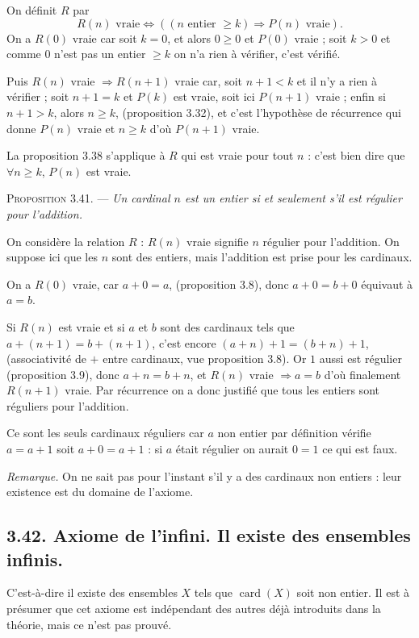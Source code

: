 On définit $R$ par
\[
R(n)\text{ vraie}\Leftrightarrow((n\text{ entier }\ge k)\Rightarrow P(n)\text{ vraie}).
\]
On a $R(0)$ vraie car soit $k=0$, et alors $0\ge0$ et $P(0)$ vraie ; soit $k>0$ et comme $0$ n'est pas un entier $\ge k$ on n'a rien à vérifier, c'est vérifié.

Puis $R(n)$ vraie $\Rightarrow R(n+1)$ vraie car, soit $n+1<k$ et il n'y a rien à vérifier ; soit $n+1=k$ et $P(k)$ est vraie, soit ici $P(n+1)$ vraie ; enfin si $n+1>k$, alors $n\ge k$, (proposition 3.32), et c'est l'hypothèse de récurrence qui donne $P(n)$ vraie et $n\ge k$ d'où $P(n+1)$ vraie.

La proposition 3.38 s'applique à $R$ qui est vraie pour tout $n$ : c'est bien dire que $\forall n\ge k$, $P(n)$ est vraie. \bookend

\medskip\noindent\textsc{Proposition 3.41.} --- \emph{Un cardinal $n$ est un entier si et seulement s'il est régulier pour l'addition.}

On considère la relation $R$ : $R(n)$ vraie signifie $n$ régulier pour l'addition. On suppose ici que les $n$ sont des entiers, mais l'addition est prise pour les cardinaux.

On a $R(0)$ vraie, car $a+0=a$, (proposition 3.8), donc $a+0=b+0$ équivaut à $a=b$.

Si $R(n)$ est vraie et si $a$ et $b$ sont des cardinaux tels que $a+(n+1)=b+(n+1)$, c'est encore $(a+n)+1=(b+n)+1$, (associativité de $+$ entre cardinaux, vue proposition 3.8). Or $1$ aussi est régulier (proposition 3.9), donc $a+n=b+n$, et $R(n)$ vraie $\Rightarrow a=b$ d'où finalement $R(n+1)$ vraie. Par récurrence on a donc justifié que tous les entiers sont réguliers pour l'addition.

Ce sont les seuls cardinaux réguliers car $a$ non entier par définition vérifie $a=a+1$ soit $a+0=a+1$ : si $a$ était régulier on aurait $0=1$ ce qui est faux. \bookend

\emph{Remarque.} On ne sait pas pour l'instant s'il y a des cardinaux non entiers : leur existence est du domaine de l'axiome.

\subsection*{3.42. Axiome de l'infini. Il existe des ensembles infinis.}

C'est-à-dire il existe des ensembles $X$ tels que $\operatorname{card}(X)$ soit non entier. Il est à présumer que cet axiome est indépendant des autres déjà introduits dans la théorie, mais ce n'est pas prouvé.

